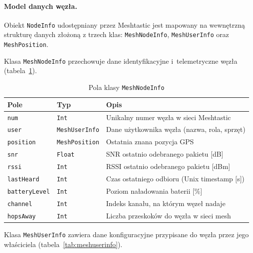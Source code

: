 \paragraph{Model danych węzła.}

Obiekt \texttt{NodeInfo} udostępniany przez Meshtastic jest mapowany na wewnętrzną strukturę
danych złożoną z trzech klas: \texttt{MeshNodeInfo}, \texttt{MeshUserInfo} oraz
\texttt{MeshPosition}. 

Klasa \texttt{MeshNodeInfo} przechowuje dane identyfikacyjne i~telemetryczne węzła
(tabela~\ref{tab:meshnodeinfo}).

\begin{table}[!h]
    \caption{Pola klasy \texttt{MeshNodeInfo}}
    \label{tab:meshnodeinfo}
    \centering
    \begin{tabular}{|l|l|p{6.5cm}|}
        \hline
        \textbf{Pole} & \textbf{Typ} & \textbf{Opis} \\
        \hline
        \texttt{num}          & \texttt{Int}           & Unikalny numer węzła w sieci Meshtastic \\
        \texttt{user}         & \texttt{MeshUserInfo} & Dane użytkownika węzła (nazwa, rola, sprzęt) \\
        \texttt{position}     & \texttt{MeshPosition} & Ostatnia znana pozycja GPS \\
        \texttt{snr}          & \texttt{Float}         & SNR ostatnio odebranego pakietu [dB] \\
        \texttt{rssi}         & \texttt{Int}           & RSSI ostatnio odebranego pakietu [dBm] \\
        \texttt{lastHeard}    & \texttt{Int}           & Czas ostatniego odbioru (Unix timestamp [s]) \\
        \texttt{batteryLevel} & \texttt{Int}           & Poziom naładowania baterii [\%] \\
        \texttt{channel}      & \texttt{Int}           & Indeks kanału, na którym węzeł nadaje \\
        \texttt{hopsAway}     & \texttt{Int}           & Liczba przeskoków do węzła w sieci mesh \\
        \hline
    \end{tabular}
\end{table}

Klasa \texttt{MeshUserInfo} zawiera dane konfiguracyjne przypisane do węzła przez jego
właściciela (tabela~\ref{tab:meshuserinfo}).

